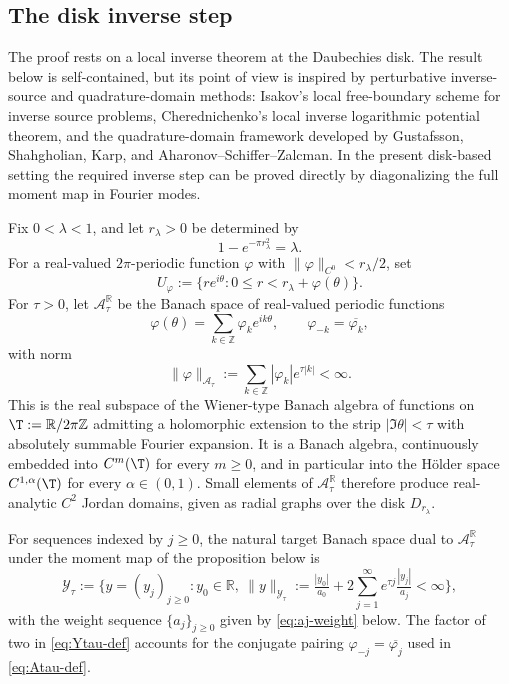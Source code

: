 \documentclass[a4paper,11pt,reqno]{amsart}
\numberwithin{equation}{section}
\theoremstyle{plain} %
\theoremstyle{definition} %
\theoremstyle{remark}
\newcommand{\R}{\mathbb{R}}
\newcommand{\Z}{\mathbb{Z}}
\begin{document}
\subsection{The disk inverse step}\label{subsec:disk-inverse-step}

The proof rests on a local inverse theorem at the Daubechies disk. The result
below is self-contained, but its point of view is inspired by perturbative
inverse-source and quadrature-domain methods: Isakov's local free-boundary
scheme for inverse source problems, Cherednichenko's local inverse logarithmic
potential theorem, and the quadrature-domain framework developed by
Gustafsson, Shahgholian, Karp, and Aharonov--Schiffer--Zalcman. In the present
disk-based setting the required inverse step can be proved directly by
diagonalizing the full moment map in Fourier modes.

Fix \(0<\lambda<1\), and let \(r_\lambda>0\) be determined by
\[
1-e^{-\pi r_\lambda^2}=\lambda .
\]
For a real-valued \(2\pi\)-periodic function \(\varphi\) with
\(\|\varphi\|_{C^0}<r_\lambda/2\), set
\[
U_\varphi
:=
\{re^{i\theta}:0\le r<r_\lambda+\varphi(\theta)\}.
\]
For \(\tau>0\), let \(\mathcal A_\tau^\R\) be the Banach space of real-valued
periodic functions
\begin{equation}\label{eq:Atau-def}
\varphi(\theta)=\sum_{k\in\Z}\varphi_k e^{ik\theta},
\qquad
\varphi_{-k}=\overline{\varphi_k},
\end{equation}
with norm
\begin{equation}\label{eq:Atau-norm}
\|\varphi\|_{\mathcal A_\tau}
:=
\sum_{k\in\Z}|\varphi_k|e^{\tau |k|}<\infty .
\end{equation}
This is the real subspace of the Wiener-type Banach algebra of functions on
\(\T:=\R/2\pi\Z\) admitting a holomorphic extension to the strip
\(|\Im\theta|<\tau\) with absolutely summable Fourier expansion. It is a Banach
algebra, continuously embedded into \(C^m(\T)\) for every \(m\ge0\), and in
particular into the H\"older space \(C^{1,\alpha}(\T)\) for every
\(\alpha\in(0,1)\). Small elements of \(\mathcal A_\tau^\R\) therefore produce
real-analytic \(C^2\) Jordan domains, given as radial graphs over the disk
\(D_{r_\lambda}\).

For sequences indexed by \(j\ge0\), the natural target Banach space dual to
\(\mathcal A_\tau^\R\) under the moment map of the proposition below is
\begin{equation}\label{eq:Ytau-def}
\mathcal Y_\tau:=
\Big\{y=(y_j)_{j\ge0}\colon y_0\in\R,\ \|y\|_{\mathcal Y_\tau}
:=\tfrac{|y_0|}{a_0}+2\sum_{j=1}^\infty e^{\tau j}\tfrac{|y_j|}{a_j}<\infty\Big\},
\end{equation}
with the weight sequence \(\{a_j\}_{j\ge0}\) given by \eqref{eq:aj-weight}
below. The factor of two in \eqref{eq:Ytau-def} accounts for the conjugate
pairing \(\varphi_{-j}=\overline{\varphi_j}\) used in \eqref{eq:Atau-def}.
\end{document}
